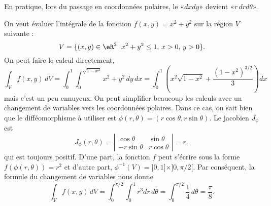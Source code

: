 En pratique, lors du passage en coordonnées polaires, le «$dxdy$» devient «$r\,drd\theta$».

\begin{example}
    On veut évaluer l'intégrale de la fonction $f(x,y)= x^2+y^2$ sur la région $V$ suivante :
    \[
    V=\{(x,y) \in \eR^2\,\vert\, x^2+y^2\leq 1,\, x>0,\, y>0\}.
    \]
    On peut faire le calcul directement,
    \[
    \int_{V}f(x,y)\, dV=\int_0^1\int_0^{\sqrt{1-x^2}}x^2+y^2\, dy\,dx=\int_0^1\left(x^2\sqrt{1-x^2} + \frac{(1-x^2)^{3/2}}{3}\right) dx
    \]
    mais c'est un peu ennuyeux. On peut simplifier beaucoup les calculs avec un changement de variables vers les coordonnées polaires. Dans ce cas, on sait bien que le difféomorphisme à utiliser est $\phi(r,\theta)=(r\cos \theta, r\sin\theta)$. Le jacobien  $J_{\phi}$ est
    \begin{equation}
     J_{\phi}(r, \theta)= \left\vert\begin{array}{cc}
    \cos \theta & \sin \theta \\
    -r\sin \theta  & r\cos \theta
    \end{array}\right\vert= r,
    \end{equation}
    qui est toujours positif. D'une part, la fonction $f$ peut s'écrire sous la forme $f(\phi(r,\theta))=r^2$ et d'autre part, $\phi^{-1}(V)=]0,1]\times]0, \pi/2[$. Par conséquent, la formule du changement de variables nous donne
    \[
    \int_{V}f(x,y)\, dV=\int_0^{\pi/2}\int_0^{1}r^3 dr\,d\theta=\int_0^{\pi/2}\frac{1}{4}\,d\theta=\frac{\pi}{8}.
    \]
\end{example}

